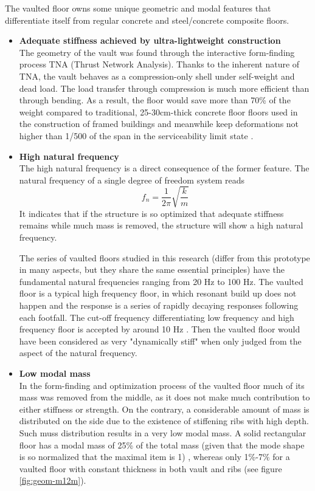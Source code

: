The vaulted floor owns some unique geometric and modal features that differentiate itself from regular concrete and steel/concrete composite floors.
\begin{itemize}
    \item \textbf{Adequate stiffness achieved by ultra-lightweight construction}\\
    The geometry of the vault was found through the interactive form-finding process TNA (Thrust Network Analysis). Thanks to the inherent nature of TNA, the vault behaves as a compression-only shell under self-weight and dead load. The load transfer through compression is much more efficient than through bending. As a result, the floor would save more than 70\% of the weight compared to traditional, 25-30cm-thick concrete floor floors used in the construction of framed buildings and meanwhile keep deformations not higher than 1/500 of the span in the serviceability limit state \cite{lopez2014prototype}. 
    
    \item \textbf{High natural frequency}\\
    The high natural frequency is a direct consequence of the former feature. The natural frequency of a single degree of freedom system reads
    \begin{equation}
        f_n=\frac{1}{2\pi}\sqrt{\frac{k}{m}}
    \end{equation}
    It indicates that if the structure is so optimized that adequate stiffness remains while much mass is removed, the structure will show a high natural frequency. 
    
     The series of vaulted floors studied in this research (differ from this prototype in many aspects, but they share the same essential principles) have the fundamental natural frequencies ranging from 20 Hz to 100 Hz. The vaulted floor is a typical high frequency floor, in which resonant build up does not happen and the response is a series of rapidly decaying responses following each footfall. The cut-off frequency differentiating low frequency and high frequency floor is accepted by around 10 Hz \cite{smith2007design}\cite{willford2007predicting}. Then the vaulted floor would have been considered as very "dynamically stiff" when only judged from the aspect of the natural frequency.
    
    \item \textbf{Low modal mass}\\
    In the form-finding and optimization process of the vaulted floor much of its mass was removed from the middle, as it does not make much contribution to either stiffness or strength. On the contrary, a considerable amount of mass is distributed on the side due to the existence of stiffening ribs with high depth. Such muss distribution results in a very low modal mass. A solid rectangular floor has a modal mass of 25\% of the total mass (given that the mode shape is so normalized that the maximal item is 1) \cite{howard2007modal}, whereas only 1\%-7\% for a vaulted floor with constant thickness in both vault and ribs (see figure \ref{fig:geom-m12m}). 
    

\end{itemize}

